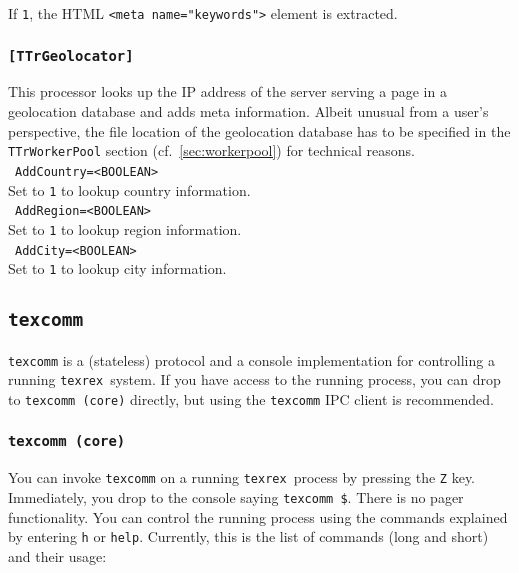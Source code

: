 \documentclass[12pt,a4paper]{article}
\newcommand{\trthis}{\texttt{texrex}}
\begin{document}
If \texttt{1}, the HTML \texttt{<meta name="keywords">} element is extracted.\\


\subsubsection{\texttt{[TTrGeolocator]}}
\label{sec:geolocator}

This processor looks up the IP address of the server serving a page in a geolocation database and adds meta information.
Albeit unusual from a user's perspective, the file location of the geolocation database has to be specified in the \texttt{TTrWorkerPool} section (cf.\ \ref{sec:workerpool}) for technical reasons.\\

\noindent\textbullet~\texttt{AddCountry=<BOOLEAN>}\\

Set to \texttt{1} to lookup country information.\\

\noindent\textbullet~\texttt{AddRegion=<BOOLEAN>}\\

Set to \texttt{1} to lookup region information.\\

\noindent\textbullet~\texttt{AddCity=<BOOLEAN>}\\

Set to \texttt{1} to lookup city information.\\

\subsection{\texttt{texcomm}}
\label{sec:texcomm}

\texttt{texcomm} is a (stateless) protocol and a console implementation for controlling a running \trthis\ system.
If you have access to the running process, you can drop to \texttt{texcomm (core)} directly, but using the \texttt{texcomm} IPC client is recommended.

\subsubsection{\texttt{texcomm (core)}}

You can invoke \texttt{texcomm} on a running \trthis\ process by pressing the \texttt{Z} key.
Immediately, you drop to the console saying \texttt{texcomm \$}.
There is no pager functionality.
You can control the running process using the commands explained by entering \texttt{h} or \texttt{help}.
Currently, this is the list of commands (long and short) and their usage:
\end{document}
